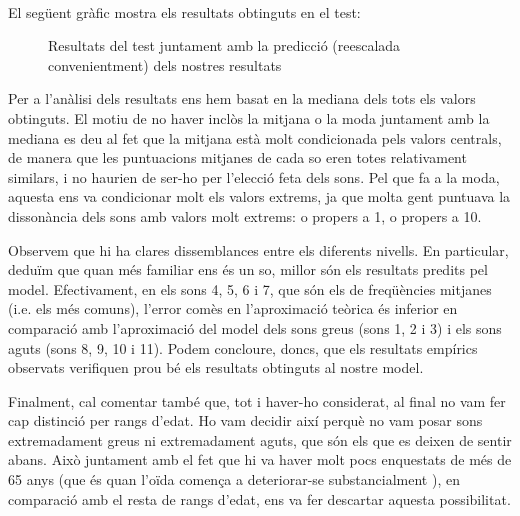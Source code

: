 \documentclass{article}
\theoremstyle{math}
\theoremstyle{TheoremNum}
\newcommand{\0}{\ensuremath{\vb{0}}}
\begin{document}
\begin{center}
  
  \\
  
\end{center}
\noindent El següent gràfic mostra els resultats obtinguts en el test:\par
\begin{figure}[ht]
  \centering
  
  \caption{Resultats del test juntament amb la predicció (reescalada convenientment) dels nostres resultats}
\end{figure}
Per a l'anàlisi dels resultats ens hem basat en la mediana dels tots els valors obtinguts. El motiu de no haver inclòs la mitjana o la moda juntament amb la mediana es deu al fet que la mitjana està molt condicionada pels valors centrals, de manera que les puntuacions mitjanes de cada so eren totes relativament similars, i no haurien de ser-ho per l'elecció feta dels sons. Pel que fa a la moda, aquesta ens va condicionar molt els valors extrems, ja que molta gent puntuava la dissonància dels sons amb valors molt extrems: o propers a 1, o propers a 10.\par
Observem que hi ha clares dissemblances entre els diferents nivells. En particular, deduïm que quan més familiar ens és un so, millor són els resultats predits pel model. Efectivament, en els sons 4, 5, 6 i 7, que són els de freqüències mitjanes (i.e. els més comuns), l'error comès en l'aproximació teòrica és inferior en comparació amb l'aproximació del model dels sons greus (sons 1, 2 i 3) i els sons aguts (sons 8, 9, 10 i 11). Podem concloure, doncs, que els resultats empírics observats verifiquen prou bé els resultats obtinguts al nostre model.\par Finalment, cal comentar també que, tot i haver-ho considerat, al final no vam fer cap distinció per rangs d'edat. Ho vam decidir així perquè no vam posar sons extremadament greus ni extremadament aguts, que són els que es deixen de sentir abans. Això juntament amb el fet que hi va haver molt pocs enquestats de més de 65 anys (que és quan l'oïda comença a deteriorar-se substancialment \cite{age_hearing}), en comparació amb el resta de rangs d'edat, ens va fer descartar aquesta possibilitat.
\end{document}
